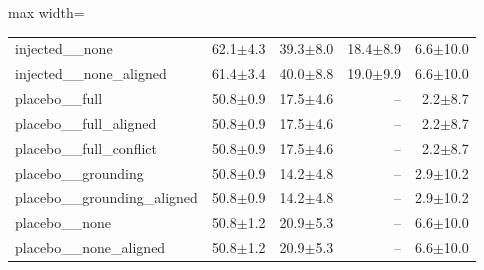 \begin{table}[t]
{\begin{adjustbox}{max width=\linewidth}
\begin{tabular}{lrrrr}
injected\_\_none & 62.1$\pm$4.3 & 39.3$\pm$8.0 & 18.4$\pm$8.9 & 6.6$\pm$10.0 \\
injected\_\_none\_aligned & 61.4$\pm$3.4 & 40.0$\pm$8.8 & 19.0$\pm$9.9 & 6.6$\pm$10.0 \\
placebo\_\_full & 50.8$\pm$0.9 & 17.5$\pm$4.6 & -- & 2.2$\pm$8.7 \\
placebo\_\_full\_aligned & 50.8$\pm$0.9 & 17.5$\pm$4.6 & -- & 2.2$\pm$8.7 \\
placebo\_\_full\_conflict & 50.8$\pm$0.9 & 17.5$\pm$4.6 & -- & 2.2$\pm$8.7 \\
placebo\_\_grounding & 50.8$\pm$0.9 & 14.2$\pm$4.8 & -- & 2.9$\pm$10.2 \\
placebo\_\_grounding\_aligned & 50.8$\pm$0.9 & 14.2$\pm$4.8 & -- & 2.9$\pm$10.2 \\
placebo\_\_none & 50.8$\pm$1.2 & 20.9$\pm$5.3 & -- & 6.6$\pm$10.0 \\
placebo\_\_none\_aligned & 50.8$\pm$1.2 & 20.9$\pm$5.3 & -- & 6.6$\pm$10.0 \\
\bottomrule
\end{tabular}
\end{adjustbox}
}
\end{table}